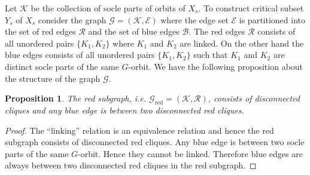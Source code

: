 \documentclass[11pt]{madras}%
\newtheorem{proposition}[theorem]{Proposition}
\theoremstyle{remark}
\newcommand{\pr}[2]{{\ensuremath{\left.{#1}\right\vert_{#2}}}}
\newcommand{\Soc}[1]{{\ensuremath{\mathrm{Soc}\left(#1\right)}}}
\begin{document}


Let $\mathcal{K}$ be the collection of socle parts of orbits of $X_s$.
To construct critical subset $Y_s$ of $X_s$ consider the graph
$\mathcal{G} = (\mathcal{K},\mathcal{E})$ where the edge set
$\mathcal{E}$ is partitioned into the set of red edges $\mathcal{R}$
and the set of blue edges $\mathcal{B}$.  The red edges $\mathcal{R}$
consists of all unordered pairs $\{ K_1 , K_2 \}$ where $K_1$ and
$K_2$ are linked.  On the other hand the blue edges consists of all
unordered pairs $\{ K_1,K_2 \}$ such that $K_1$ and $K_2$ are distinct
socle parts of the same $G$-orbit.  We have the following proposition
about the structure of the graph $\mathcal{G}$.

\begin{proposition}\label{prop-socle-graph-property}
  The red subgraph, i.e. $\mathcal{G}_{\mathrm{red}} =
  (\mathcal{K},\mathcal{R})$, consists of disconnected cliques and any
  blue edge is between two disconnected red cliques.
\end{proposition}
\begin{proof}
  The ``linking'' relation is an equivalence relation and hence the
  red subgraph consists of disconnected red cliques. Any blue edge is
  between two socle parts of the same $G$-orbit. Hence they cannot be
  linked. Therefore blue edges are always between two disconnected red
  cliques in the red subgraph.
\end{proof}
\end{document}
